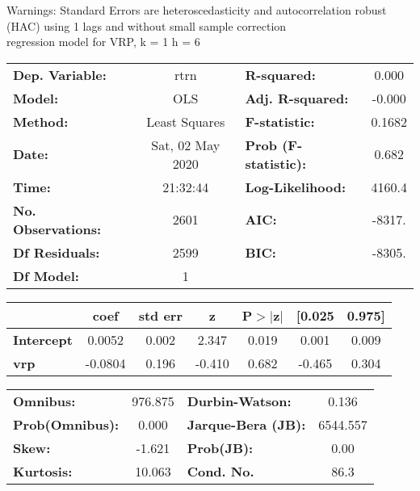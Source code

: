 Warnings: \newline
 [1] Standard Errors are heteroscedasticity and autocorrelation robust (HAC) using 1 lags and without small sample correction\\ 

regression model for VRP, k = 1 h = 6\begin{center}
\begin{tabular}{lclc}
\toprule
\textbf{Dep. Variable:}    &       rtrn       & \textbf{  R-squared:         } &     0.000   \\
\textbf{Model:}            &       OLS        & \textbf{  Adj. R-squared:    } &    -0.000   \\
\textbf{Method:}           &  Least Squares   & \textbf{  F-statistic:       } &    0.1682   \\
\textbf{Date:}             & Sat, 02 May 2020 & \textbf{  Prob (F-statistic):} &    0.682    \\
\textbf{Time:}             &     21:32:44     & \textbf{  Log-Likelihood:    } &    4160.4   \\
\textbf{No. Observations:} &        2601      & \textbf{  AIC:               } &    -8317.   \\
\textbf{Df Residuals:}     &        2599      & \textbf{  BIC:               } &    -8305.   \\
\textbf{Df Model:}         &           1      & \textbf{                     } &             \\
\bottomrule
\end{tabular}
\begin{tabular}{lcccccc}
                   & \textbf{coef} & \textbf{std err} & \textbf{z} & \textbf{P$> |$z$|$} & \textbf{[0.025} & \textbf{0.975]}  \\
\midrule
\textbf{Intercept} &       0.0052  &        0.002     &     2.347  &         0.019        &        0.001    &        0.009     \\
\textbf{vrp}       &      -0.0804  &        0.196     &    -0.410  &         0.682        &       -0.465    &        0.304     \\
\bottomrule
\end{tabular}
\begin{tabular}{lclc}
\textbf{Omnibus:}       & 976.875 & \textbf{  Durbin-Watson:     } &    0.136  \\
\textbf{Prob(Omnibus):} &   0.000 & \textbf{  Jarque-Bera (JB):  } & 6544.557  \\
\textbf{Skew:}          &  -1.621 & \textbf{  Prob(JB):          } &     0.00  \\
\textbf{Kurtosis:}      &  10.063 & \textbf{  Cond. No.          } &     86.3  \\
\bottomrule
\end{tabular}
\end{center}

